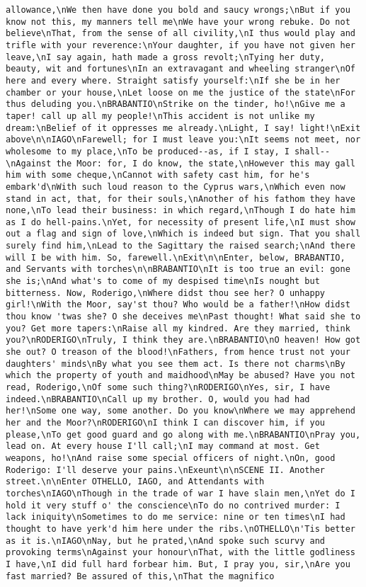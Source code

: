 \begin{verbatim}
allowance,\nWe then have done you bold and saucy wrongs;\nBut if you know not this, my manners tell me\nWe have your wrong rebuke. Do not believe\nThat, from the sense of all civility,\nI thus would play and trifle with your reverence:\nYour daughter, if you have not given her leave,\nI say again, hath made a gross revolt;\nTying her duty, beauty, wit and fortunes\nIn an extravagant and wheeling stranger\nOf here and every where. Straight satisfy yourself:\nIf she be in her chamber or your house,\nLet loose on me the justice of the state\nFor thus deluding you.\nBRABANTIO\nStrike on the tinder, ho!\nGive me a taper! call up all my people!\nThis accident is not unlike my dream:\nBelief of it oppresses me already.\nLight, I say! light!\nExit above\n\nIAGO\nFarewell; for I must leave you:\nIt seems not meet, nor wholesome to my place,\nTo be produced--as, if I stay, I shall--\nAgainst the Moor: for, I do know, the state,\nHowever this may gall him with some cheque,\nCannot with safety cast him, for he's embark'd\nWith such loud reason to the Cyprus wars,\nWhich even now stand in act, that, for their souls,\nAnother of his fathom they have none,\nTo lead their business: in which regard,\nThough I do hate him as I do hell-pains.\nYet, for necessity of present life,\nI must show out a flag and sign of love,\nWhich is indeed but sign. That you shall surely find him,\nLead to the Sagittary the raised search;\nAnd there will I be with him. So, farewell.\nExit\n\nEnter, below, BRABANTIO, and Servants with torches\n\nBRABANTIO\nIt is too true an evil: gone she is;\nAnd what's to come of my despised time\nIs nought but bitterness. Now, Roderigo,\nWhere didst thou see her? O unhappy girl!\nWith the Moor, say'st thou? Who would be a father!\nHow didst thou know 'twas she? O she deceives me\nPast thought! What said she to you? Get more tapers:\nRaise all my kindred. Are they married, think you?\nRODERIGO\nTruly, I think they are.\nBRABANTIO\nO heaven! How got she out? O treason of the blood!\nFathers, from hence trust not your daughters' minds\nBy what you see them act. Is there not charms\nBy which the property of youth and maidhood\nMay be abused? Have you not read, Roderigo,\nOf some such thing?\nRODERIGO\nYes, sir, I have indeed.\nBRABANTIO\nCall up my brother. O, would you had had her!\nSome one way, some another. Do you know\nWhere we may apprehend her and the Moor?\nRODERIGO\nI think I can discover him, if you please,\nTo get good guard and go along with me.\nBRABANTIO\nPray you, lead on. At every house I'll call;\nI may command at most. Get weapons, ho!\nAnd raise some special officers of night.\nOn, good Roderigo: I'll deserve your pains.\nExeunt\n\nSCENE II. Another street.\n\nEnter OTHELLO, IAGO, and Attendants with torches\nIAGO\nThough in the trade of war I have slain men,\nYet do I hold it very stuff o' the conscience\nTo do no contrived murder: I lack iniquity\nSometimes to do me service: nine or ten times\nI had thought to have yerk'd him here under the ribs.\nOTHELLO\n'Tis better as it is.\nIAGO\nNay, but he prated,\nAnd spoke such scurvy and provoking terms\nAgainst your honour\nThat, with the little godliness I have,\nI did full hard forbear him. But, I pray you, sir,\nAre you fast married? Be assured of this,\nThat the magnifico 
\end{verbatim}
